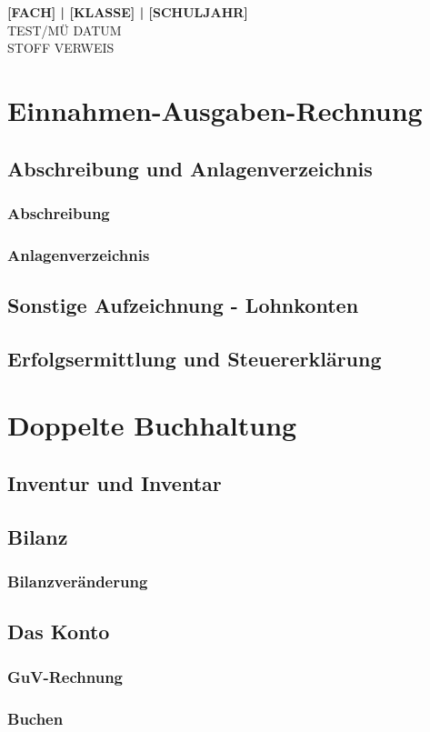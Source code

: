 \documentclass[a4paper, ngerman]{article}
\begin{document}
\begin{framed}

    \begin{center}
        \textbf{[FACH] | [KLASSE] | [SCHULJAHR]} \\
        TEST/MÜ DATUM \\
        STOFF VERWEIS
    \end{center}

\end{framed}

\section{Einnahmen-Ausgaben-Rechnung}
\subsection{Abschreibung und Anlagenverzeichnis}
\subsubsection{Abschreibung}
\subsubsection{Anlagenverzeichnis}
\subsection{Sonstige Aufzeichnung - Lohnkonten}
\subsection{Erfolgsermittlung und Steuererklärung}
\section{Doppelte Buchhaltung}
\subsection{Inventur und Inventar}
\subsection{Bilanz}
\subsubsection{Bilanzveränderung}
\subsection{Das Konto}
\subsubsection{GuV-Rechnung}
\subsubsection{Buchen}
\end{document}

